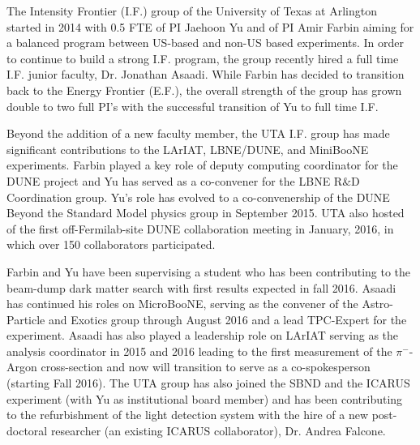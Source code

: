 
\begin{center}
\textbf{\Large{} }
\end{center}

The Intensity Frontier (I.F.) group of the University of Texas at Arlington started in 2014 with 0.5 FTE of PI Jaehoon Yu and of PI Amir Farbin aiming for a balanced program between US-based and non-US based experiments. In order to continue to build a strong I.F. program, the group recently hired a full time I.F. junior faculty, Dr. Jonathan Asaadi. While Farbin has decided to transition back to the Energy Frontier (E.F.), the overall strength of the group has grown double to two full PI's with the successful transition of Yu to full time I.F.

Beyond the addition of a new faculty member, the UTA I.F. group has made significant contributions to the LArIAT, LBNE/DUNE, and MiniBooNE experiments. Farbin played a key role of deputy computing coordinator for the DUNE project and Yu has served as a co-convener for the LBNE R$\&$D Coordination group. Yu's role has evolved to a co-convenership of the DUNE Beyond the Standard Model physics group in September 2015. UTA also hosted of the first off-Fermilab-site DUNE collaboration meeting in January, 2016, in which over 150 collaborators participated. 

Farbin and Yu have been supervising a student who has been contributing to the beam-dump dark matter search with first results expected in fall 2016. Asaadi has continued his roles on MicroBooNE, serving as the convener of the Astro-Particle and Exotics group through August 2016 and a lead TPC-Expert for the experiment. Asaadi has also played a leadership role on LArIAT serving as the analysis coordinator in 2015 and 2016 leading to the first measurement of the $\pi^{-}$-Argon cross-section and now will transition to serve as a co-spokesperson (starting Fall 2016). The UTA group has also joined the SBND and the ICARUS experiment (with Yu as institutional board member) and has been contributing to the refurbishment of the light detection system with the hire of a new post-doctoral researcher (an existing ICARUS collaborator), Dr. Andrea Falcone.

